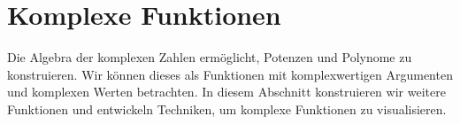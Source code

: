 %
%
%
\section{Komplexe Funktionen
\label{buch:komplex:section:funktionen}}
Die Algebra der komplexen Zahlen ermöglicht, Potenzen und Polynome
zu konstruieren.
Wir können dieses als Funktionen mit komplexwertigen Argumenten
und komplexen Werten betrachten.
In diesem Abschnitt konstruieren wir weitere Funktionen und entwickeln
Techniken, um komplexe Funktionen zu visualisieren.





